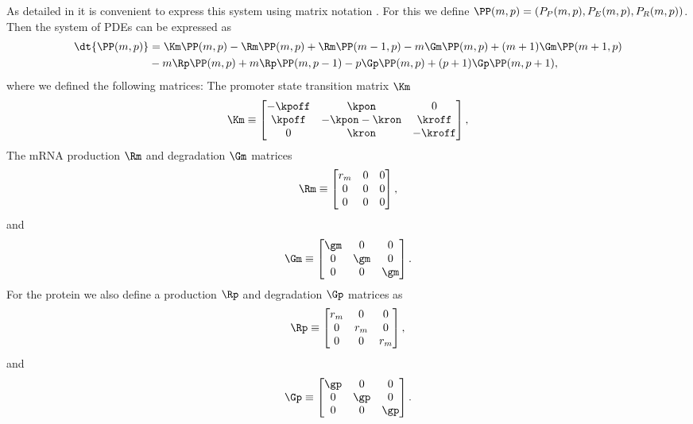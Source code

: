 As detailed in  it is convenient to express this system using
matrix notation \cite{Sanchez2013}. For this we define $\PP(m, p) = (P_P(m, p),
P_E(m, p), P_R(m, p))$. Then the system of PDEs can be expressed as
\begin{equation}
  \begin{aligned}
    \dt{\PP(m, p)} &= \Km \PP(m, p)
    - \Rm \PP(m, p) + \Rm \PP(m-1, p)
    - m \Gm \PP(m, p) + (m + 1) \Gm \PP(m + 1, p)\\
    &- m \Rp \PP(m, p) + m \Rp \PP(m, p - 1)
    - p \Gp \PP(m, p) + (p + 1) \Gp \PP(m, p + 1),
  \end{aligned}
\end{equation}
where we defined the following matrices: The promoter state transition matrix
$\Km$
\begin{align}
  \Km \equiv
  \begin{bmatrix}
    -\kpoff   & \kpon         & 0\\
    \kpoff    & -\kpon -\kron  & \kroff\\
    0         & \kron         & -\kroff
  \end{bmatrix},
\end{align}
The mRNA production $\Rm$ and degradation $\Gm$ matrices
\begin{equation}
  \Rm \equiv
  \begin{bmatrix}
    r_m   & 0 & 0\\
    0     & 0 & 0\\
    0     & 0 & 0\\
  \end{bmatrix},
\end{equation}
and
\begin{equation}
  \Gm \equiv
  \begin{bmatrix}
    \gm   & 0   & 0\\
    0     & \gm & 0\\
    0     & 0   & \gm\\
  \end{bmatrix}.
\end{equation}
For the protein we also define a production $\Rp$ and degradation $\Gp$ matrices
as
\begin{equation}
  \Rp \equiv
  \begin{bmatrix}
    r_m   & 0   & 0\\
    0     & r_m & 0\\
    0     & 0   & r_m\\
  \end{bmatrix},
\end{equation}
and
\begin{equation}
  \Gp \equiv
  \begin{bmatrix}
    \gp   & 0   & 0\\
    0     & \gp & 0\\
    0     & 0   & \gp\\
  \end{bmatrix}.
\end{equation}

